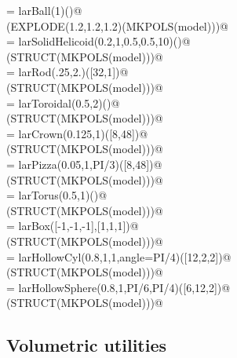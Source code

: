 \documentclass[11pt,oneside]{article}	%
\begin{document}
\begin{flushleft}
\begin{list}{}{}
\mbox{}\verb@model = larBall(1)()@\\
\mbox{}\verb@VIEW(EXPLODE(1.2,1.2,1.2)(MKPOLS(model)))@\\
\mbox{}\verb@model = larSolidHelicoid(0.2,1,0.5,0.5,10)()@\\
\mbox{}\verb@VIEW(STRUCT(MKPOLS(model)))@\\
\mbox{}\verb@model = larRod(.25,2.)([32,1])@\\
\mbox{}\verb@VIEW(STRUCT(MKPOLS(model)))@\\
\mbox{}\verb@model = larToroidal(0.5,2)()@\\
\mbox{}\verb@VIEW(STRUCT(MKPOLS(model)))@\\
\mbox{}\verb@model = larCrown(0.125,1)([8,48])@\\
\mbox{}\verb@VIEW(STRUCT(MKPOLS(model)))@\\
\mbox{}\verb@model = larPizza(0.05,1,PI/3)([8,48])@\\
\mbox{}\verb@VIEW(STRUCT(MKPOLS(model)))@\\
\mbox{}\verb@model = larTorus(0.5,1)()@\\
\mbox{}\verb@VIEW(STRUCT(MKPOLS(model)))@\\
\mbox{}\verb@model = larBox([-1,-1,-1],[1,1,1])@\\
\mbox{}\verb@VIEW(STRUCT(MKPOLS(model)))@\\
\mbox{}\verb@model = larHollowCyl(0.8,1,1,angle=PI/4)([12,2,2])@\\
\mbox{}\verb@VIEW(STRUCT(MKPOLS(model)))@\\
\mbox{}\verb@model = larHollowSphere(0.8,1,PI/6,PI/4)([6,12,2])@\\
\mbox{}\verb@VIEW(STRUCT(MKPOLS(model)))@\\
\mbox{}\verb@@{\NWsep}
\end{list}
\vspace{-2ex}
\end{flushleft}


\subsection{Volumetric utilities}
\end{document}
